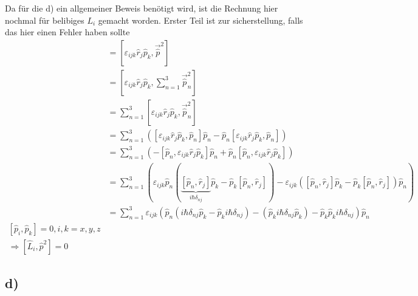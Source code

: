     Da für die d) ein allgemeiner Beweis benötigt wird, ist die Rechnung hier nochmal für belibiges $L_i$ gemacht worden.
    Erster Teil ist zur sicherstellung, falls das hier einen Fehler haben sollte
    \begin{align}
    [\hat L _i , \hat p ^2] &= [\varepsilon _{ijk} \hat r _j \hat p_k , \vec{\hat p}^2]\\
    &=[\varepsilon _{ijk} \hat r _j \hat p_k , \sum_{n=1}^3 \vec{\hat p}_n^2]\\
    &=\sum_{n=1}^3 [\varepsilon _{ijk} \hat r _j \hat p_k ,  \vec{\hat p}_n^2]\\
    &=\sum_{n=1}^3 ([\varepsilon _{ijk} \hat r _j \hat p_k , \hat p _n]\hat p _n -\hat p_n[\varepsilon _{ijk} \hat r _j \hat p_k , \hat p _n] )\\
    &=\sum_{n=1}^3 (-[ \hat p _n, \varepsilon _{ijk} \hat r _j \hat p_k]\hat p _n +\hat p_n[ \hat p _n, \varepsilon _{ijk} \hat r _j \hat p_k] )\\
    &=\sum_{n=1}^3 (\varepsilon _{ijk} \hat  p _n (\underbrace{[\hat p _n , \hat r _j]}_{i \hbar \delta _{nj}} \hat p_k - \hat p _k [\hat p _n , \hat r _j]) - \varepsilon _{ijk} ( [\hat p _n , \hat r _j ]\hat p _k - \hat p _k [\hat p _n , \hat r _j] ) \hat p _n )\\
    &=\sum_{n=1}^3 \varepsilon _{ijk} (\hat p _n (i \hbar \delta _{nj} \hat p _k - \hat p _k i \hbar \delta _{nj} )- (\hat p _k i \hbar \delta _{nj} \hat p _k) - \hat p _k \hat p _k i \hbar \delta _{nj} ) \hat p _n \\
    [\hat p _i , \hat p _k] =0, i,k=x,y,z \\
    \Rightarrow [\hat L _i , \hat p ^2] =0
    \end{align}

    \subsection{d)}

